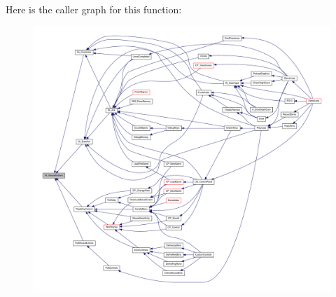 Here is the caller graph for this function:
\nopagebreak
\begin{figure}[H]
\begin{center}
\leavevmode
\includegraphics[width=400pt]{ID__IN_8H_a1dc32dd9a62a416001a9954a70dc4563_icgraph}
\end{center}
\end{figure}



